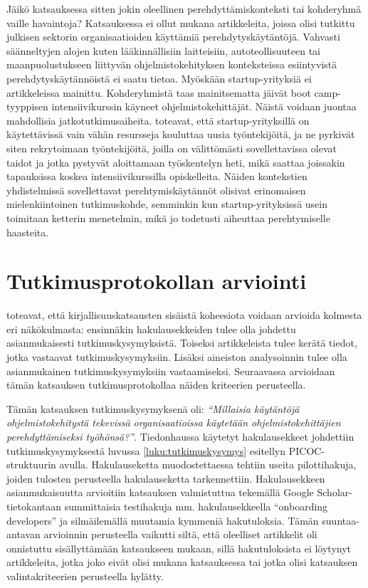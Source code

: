 \documentclass[utf8]{gradu3}
\begin{document}
Jäikö katsauksessa sitten jokin oleellinen perehdyttämiskonteksti tai kohderyhmä vaille havaintoja? Katsauksessa ei ollut mukana artikkeleita, joissa olisi tutkittu julkisen sektorin organisaatioiden käyttämiä perehdytyskäytäntöjä. Vahvasti säänneltyjen alojen kuten lääkinnällisiin laitteisiin, autoteollisuuteen tai maanpuolustukseen liittyvän ohjelmistokehityksen konteksteissa esiintyvistä perehdytyskäytännöistä ei saatu tietoa. Myöskään startup-yrityksiä ei artikkeleissa mainittu. Kohderyhmistä taas mainitsematta jäivät boot camp-tyyppisen intensiivikurssin käyneet ohjelmistokehittäjät. Näistä voidaan juontaa mahdollisia jatkotutkimusaiheita. \textcite{lyon-green-2021} toteavat, että startup-yrityksillä on käytettävissä vain vähän resursseja kouluttaa uusia työntekijöitä, ja ne pyrkivät siten rekrytoimaan työntekijöitä, joilla on välittömästi sovellettavissa olevat taidot ja jotka pystyvät aloittamaan työskentelyn heti, mikä saattaa joissakin tapauksissa koskea intensiivikurssilla opiskelleita. Näiden kontekstien yhdistelmissä sovellettavat perehtymiskäytännöt olisivat erinomaisen mielenkiintoinen tutkimuskohde, semminkin kun startup-yrityksissä usein toimitaan ketterin menetelmin, mikä jo todetusti aiheuttaa perehtymiselle haasteita.

\section{Tutkimusprotokollan arviointi}
\label{luku-tutkimusprotokollan-arviointi}

\textcite{kitchenham-charters-2007} toteavat, että kirjallisuuskatsausten sisäistä koheesiota voidaan arvioida kolmesta eri näkökulmasta: ensinnäkin hakulausekkeiden tulee olla johdettu asianmukaisesti tutkimuskysymyksistä. Toiseksi artikkeleista tulee kerätä tiedot, jotka vastaavat tutkimuskysymyksiin. Lisäksi aineiston analysoinnin tulee olla asianmukainen tutkimuskysymyksiin vastaamiseksi. Seuraavassa arvioidaan tämän katsauksen tutkimusprotokollaa näiden kriteerien perusteella.

Tämän katsauksen tutkimuskysymyksenä oli: \textit{“Millaisia käytäntöjä ohjelmistokehitystä tekevissä organisaatioissa käytetään ohjelmistokehittäjien perehdyttämiseksi työhönsä?”}. Tiedonhaussa käytetyt hakulausekkeet johdettiin tutkimuskysymyksestä luvussa \ref{luku:tutkimuskysymys} esitellyn PICOC-struktuurin avulla. Hakulauseketta muodostettaessa tehtiin useita pilottihakuja, joiden tulosten perusteella hakulauseketta tarkennettiin. Hakulausekkeen asianmukaisuutta arvioitiin katsauksen valmistuttua tekemällä Google Scholar-tietokantaan summittaisia testihakuja mm. hakulausekkeella “onboarding developers” ja silmäilemällä muutamia kymmeniä hakutuloksia. Tämän suuntaa-antavan arvioinnin perusteella vaikutti siltä, että oleelliset artikkelit oli onnistuttu sisällyttämään katsaukseen mukaan, sillä hakutuloksista ei löytynyt artikkeleita, jotka joko eivät olisi mukana katsauksessa tai jotka olisi katsauksen valintakriteerien perusteella hylätty. 
\end{document}
